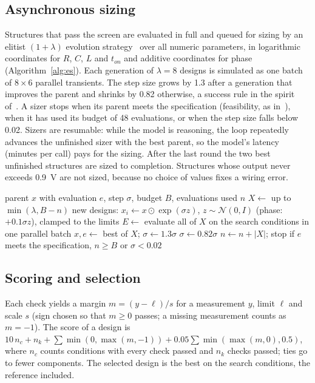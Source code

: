\documentclass[journal]{IEEEtran}
\begin{document}
\subsection{Asynchronous sizing}\label{sec:sizing}
Structures that pass the screen are evaluated in full and queued for sizing by an elitist $(1+\lambda)$
evolution strategy~\cite{rechenberg1973,hansen2016cma} over all numeric parameters, in logarithmic
coordinates for $R$, $C$, $L$ and $t_{on}$ and additive coordinates for phase
(Algorithm~\ref{alg:es}). Each generation of $\lambda=8$ designs is simulated as one batch of
$8\times 6$ parallel transients. The step size grows by 1.3 after a generation that improves the
parent and shrinks by 0.82 otherwise, a success rule in the spirit of~\cite{rechenberg1973}. A sizer
stops when its parent meets the specification (feasibility, as in~\cite{zhao2022drl}), when it has used
its budget of 48 evaluations, or when the step size falls below 0.02. Sizers are resumable: while the
model is reasoning, the loop repeatedly advances the unfinished sizer with the best parent, so the
model's latency (minutes per call) pays for the sizing. After the last round the two best unfinished
structures are sized to completion. Structures whose output never exceeds \SI{0.9}{V} are not sized,
because no choice of values fixes a wiring error.

\begin{algorithm}[t]
\caption{Resumable $(1+\lambda)$-ES sizing step}\label{alg:es}
\begin{algorithmic}[1]
\Require parent $x$ with evaluation $e$, step $\sigma$, budget $B$, evaluations used $n$
\State $X \gets$ up to $\min(\lambda, B-n)$ new designs: $x_i \gets x \odot \exp(\sigma z)$, $z\sim\mathcal{N}(0,I)$ (phase: $+0.1\sigma z$), clamped to the limits
\State $E \gets$ evaluate all of $X$ on the search conditions in one parallel batch
 \State $x, e \gets$ best of $X$; $\sigma \gets 1.3\sigma$
\Else \State $\sigma \gets 0.82\sigma$ \EndIf
\State $n \gets n + |X|$; stop if $e$ meets the specification, $n\ge B$ or $\sigma < 0.02$
\end{algorithmic}
\end{algorithm}

\subsection{Scoring and selection}
Each check yields a margin $m = (y - \ell)/s$ for a measurement $y$, limit $\ell$ and scale $s$ (sign
chosen so that $m\ge 0$ passes; a missing measurement counts as $m=-1$). The score of a design is
$10\,n_{c} + n_{k} + \sum \min(0,\max(m,-1)) + 0.05\sum \min(\max(m,0),0.5)$, where $n_c$ counts conditions
with every check passed and $n_k$ checks passed; ties go to fewer components. The selected design is the
best on the search conditions, the reference included.
\end{document}
